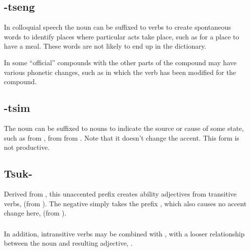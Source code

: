 \subsection{-tseng} In colloquial speech the noun  
can be suffixed to verbs to create spon\-ta\-ne\-ous words to identify
places where particular acts take place, such as  for a
place to have a meal.  These words are not likely to end up in the
dictionary.

In some ``official'' compounds with  the other parts of the
compound may have various phonetic changes, such
as   in which the verb  has been
modified for the compound.

\subsection{-tsim} The noun   can be suffixed to
nouns to indicate the source or cause of some state, such
as  
from  ,   from  
 
from  .  Note that
it doesn't change the accent.  This form is not productive.

\subsection{Tsuk-} Derived from , this unaccented prefix
creates ability adjectives from trans\-it\-ive verbs, 
 (from  ).  The negative simply takes the
prefix , which also causes no accent change here,
  (from  ).

\subsubsection{} In addition, intransitive verbs may
be combined with , with a looser relationship between the
noun and resulting adjective, 
  .

